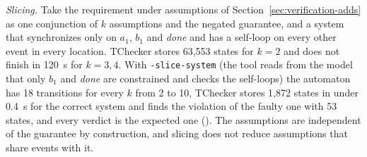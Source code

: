 \label{sec:eval-slicing}\emph{Slicing.} Take the requirement under assumptions of Section~\ref{sec:verification-adds} as one conjunction of $k$ assumptions and the negated guarantee, and a system that synchronizes only on $a_1$, $b_1$ and \emph{done} and has a self-loop on every other event in every location. TChecker stores 63{,}553 states for $k=2$ and does not finish in 120~s for $k=3,4$. With \texttt{-slice-system} (the tool reads from the model that only $b_1$ and \emph{done} are constrained and checks the self-loops) the automaton has 18 transitions for every $k$ from 2 to 10, TChecker stores 1{,}872 states in under 0.4~s for the correct system and finds the violation of the faulty one with 53 states, and every verdict is the expected one ().  The assumptions are independent of the guarantee by construction, and slicing does not reduce assumptions that share events with it.
